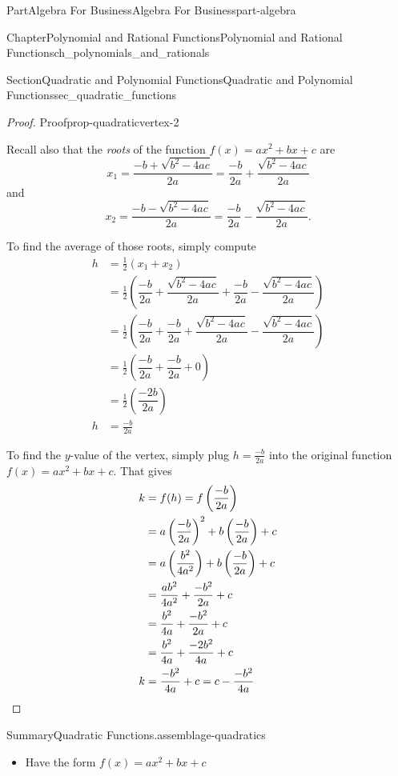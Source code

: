 \documentclass[oneside,10pt,]{tufte-book}
\numberwithin{equation}{chapter}
\newcommand{\qedhere}{\relax}
\newcommand{\amp}{&}
\begin{document}
\begin{partptx}{Part}{Algebra For Business}{}{Algebra For Business}{}{}{part-algebra}
\begin{chapterptx}{Chapter}{Polynomial and Rational Functions}{}{Polynomial and Rational Functions}{}{}{ch_polynomials_and_rationals}
\begin{sectionptx}{Section}{Quadratic and Polynomial Functions}{}{Quadratic and Polynomial Functions}{}{}{sec_quadratic_functions}
\begin{proof}{Proof}{}{prop-quadraticvertex-2}
\par
Recall also that the \emph{roots} of the function \(f(x)=ax^2+ bx + c\) are%
\begin{equation*}
x_1 = \dfrac{-b + \sqrt{b^2 - 4ac}}{2a}= \dfrac{-b}{2a} + \dfrac{\sqrt{b^2 - 4ac}}{2a} 
\end{equation*}
and%
\begin{equation*}
x_2 = \dfrac{-b - \sqrt{b^2 - 4ac}}{2a}= \dfrac{-b}{2a} - \dfrac{\sqrt{b^2 - 4ac}}{2a} \text{.}
\end{equation*}
%
\par
To find the average of those roots, simply compute%
\begin{align*}
h  \amp =  \frac{1}{2} (x_1 + x_2) \\
\amp = \frac{1}{2} \left( \dfrac{-b}{2a} + \dfrac{\sqrt{b^2 - 4ac}}{2a} + \dfrac{-b}{2a} - \dfrac{\sqrt{b^2 - 4ac}}{2a} \right)  \\
\amp = \frac{1}{2} \left( \dfrac{-b}{2a}  + \dfrac{-b}{2a} + \dfrac{\sqrt{b^2 - 4ac}}{2a} - \dfrac{\sqrt{b^2 - 4ac}}{2a} \right)  \\
\amp = \frac{1}{2} \left( \dfrac{-b}{2a}  + \dfrac{-b}{2a} + 0 \right)\\
\amp = \frac{1}{2} \left( \dfrac{-2b}{2a}\right)\\
h \amp = \frac{-b}{2a}
\end{align*}
%
\par
To find the \(y\)-value of the vertex, simply plug \(h=\frac{-b}{2a}\) into the original function \(f(x)=ax^2 + bx + c\).  That gives%
\begin{align*}
k \amp = f(h) = f\left(\dfrac{-b}{2a}\right)\\
\amp = a \left(\dfrac{-b}{2a}\right)^2 + b\left(\dfrac{-b}{2a}\right) + c \\
\amp =  a \left(\dfrac{b^2}{4a^2}\right) + b\left(\dfrac{-b}{2a}\right) + c\\
\amp = \dfrac{a b^2}{4a^2}  + \dfrac{-b^2}{2a} + c\\
\amp = \dfrac{b^2}{4a}  + \dfrac{-b^2}{2a} + c\\
\amp = \dfrac{b^2}{4a}  + \dfrac{-2b^2}{4a} + c\\
k \amp = \dfrac{-b^2}{4a} + c = c - \dfrac{-b^2}{4a}\qedhere
\end{align*}
%
\end{proof}
\begin{assemblage}{Summary}{Quadratic Functions.}{assemblage-quadratics}%
%
\begin{itemize}[label=\textbullet]
\item{}Have the form \(f(x) = ax^2 + bx + c\)%

\end{itemize}
\end{assemblage}
\end{sectionptx}
\end{chapterptx}
\end{partptx}
\end{document}
